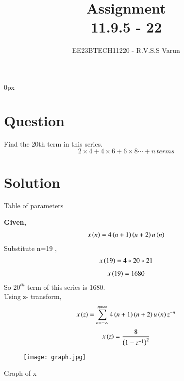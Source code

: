 \documentclass[beamer]{IEEEtran}
\theoremstyle{remark}
\begin{document}
\parindent 0px


\title{Assignment\\[1ex]11.9.5 - 22}
\author{EE23BTECH11220 - R.V.S.S Varun$^{}$%
}
\maketitle
\newpage
\bigskip

\renewcommand{\thefigure}{\theenumi}
\renewcommand{\thetable}{\theenumi}
\section*{Question}
Find the 20th term in this series.\\
$$2\times4+4\times6+6\times8\cdots+n\,terms$$ 


\section*{Solution}

\begin{table}[h]
    \centering
    
    \caption{Table of parameters}
    \label{tab:my_label}
\end{table}
\textbf{Given,}
\begin{align}
  x\left(n\right)=4\left(n+1\right)\left(n+2\right)u\left(n\right)
\end{align}
Substitute n=19 ,
\begin{align}
    x\left(19\right)=4*20*21
\end{align}
\begin{align}
    x\left(19\right)=1680
\end{align}
So $20^{th}$ term of this series is 1680.\\
Using z- transform,
\begin{align}
    x\left(z\right)=\sum_{n=-\infty}^{n=\infty}4\left(n+1\right)\left(n+2\right)u\left(n\right)z^{-n}
\end{align}
\begin{align}
    x\left(z\right)=\frac{8}{\left(1-z^{-1}\right)^2}
\end{align}
\begin{figure}[h]
    \centering
    \texttt{[image: graph.jpg]}
    
    \label{fig:enter-label}
\end{figure}
\begin{center}
Graph of x
   \end{center}
\end{document}
